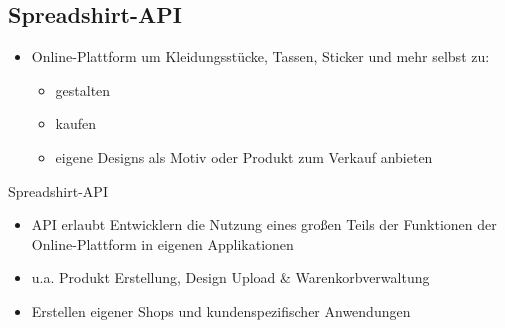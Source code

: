 \subsection{Spreadshirt-API}
\begin{frame}[squeeze]
    \begin{itemize}
        \item Online-Plattform um Kleidungsstücke, Tassen, Sticker und mehr selbst zu:
        \begin{itemize}
            \item gestalten
            \item kaufen
            \item eigene Designs als Motiv oder Produkt zum Verkauf anbieten
        \end{itemize}
    \end{itemize}

    \begin{block}{Spreadshirt-API}
        \begin{itemize}
            \item API erlaubt Entwicklern die Nutzung eines großen Teils der Funktionen der Online-Plattform in eigenen Applikationen
            \item u.a. Produkt Erstellung, Design Upload \& Warenkorbverwaltung
            \item Erstellen eigener Shops und kundenspezifischer Anwendungen %
        \end{itemize}
    \end{block}
\end{frame}
